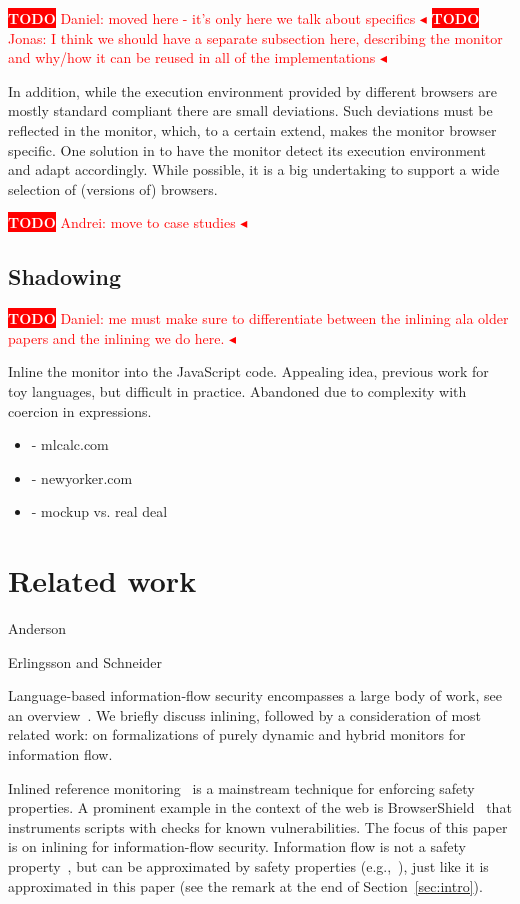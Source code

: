 \documentclass{llncs}
\newcommand{\todo}[1]{\colorbox{red}{\textcolor{white}{\sffamily\bfseries\scriptsize TODO}} \textcolor{red}{#1} \textcolor{red}{$\blacktriangleleft$}}
\begin{document}
\todo{Daniel: moved here - it's only here we talk about specifics}
\todo{Jonas: I think we should have a separate subsection here, describing the monitor and why/how it can be reused in all of the implementations}

In addition, while the
execution environment provided by different browsers are mostly standard
compliant there are small deviations. Such deviations must be reflected in 
the monitor, which, to a certain extend, makes the monitor browser specific.
One solution in to have the monitor detect its execution environment
and adapt accordingly. While possible, it is a big undertaking to support
a wide selection of (versions of) browsers.


\todo{Andrei: move to case studies}
\subsection{Shadowing}
\todo{Daniel: me must make sure to differentiate between the inlining ala older papers and the inlining we do here.}

Inline the monitor into the JavaScript code. Appealing idea, previous work for 
toy languages, but difficult in practice. Abandoned due to complexity with 
coercion in expressions.


\begin{itemize}
\item- mlcalc.com
\item- newyorker.com
\item- mockup vs. real deal
\end{itemize}

\section{Related work}
\label{sec:related}

Anderson~\cite{Anderson:72}

Erlingsson and Schneider~\cite{DBLP:conf/nspw/ErlingssonS99}

Language-based information-flow security encompasses a large body of
work, see an overview~\cite{Sabelfeld:Myers:JSAC}. We briefly
discuss inlining, followed by a consideration of most related work: on
formalizations of purely dynamic and hybrid monitors for information flow.

Inlined reference monitoring~\cite{Erlingsson:PhD04} is a mainstream
technique for enforcing safety properties. 
A prominent example in the context of the web is
BrowserShield~\cite{Reis+:TWeb07} that instruments scripts with
checks for known vulnerabilities.
The focus of this paper is on inlining for information-flow security. Information flow is not
a safety property~\cite{McLean:SSP94}, but can be approximated by
safety properties
(e.g.,~\cite{Boudol:FAST08,Sabelfeld:Russo:PSI09,Austin:Flanagan:PLAS09}),
just like it is approximated in this paper (see the remark at the end of Section~\ref{sec:intro}).
\end{document}
